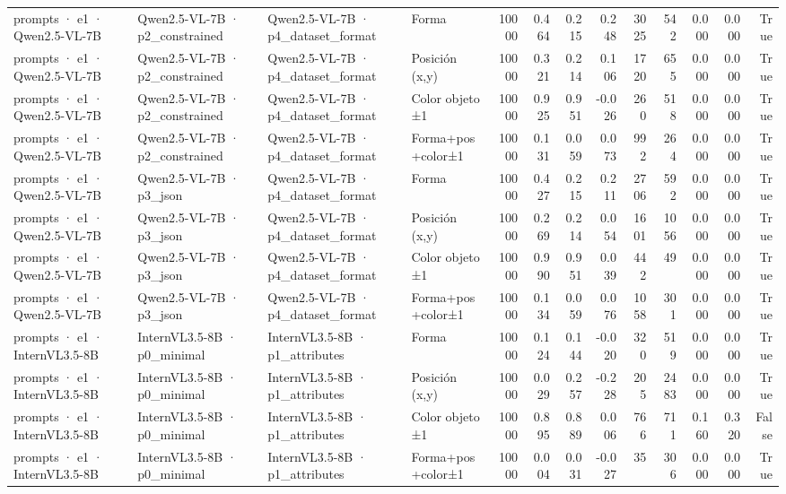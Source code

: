 \begin{tabular}{llllrrrrrrrrr}
prompts · e1 · Qwen2.5-VL-7B & Qwen2.5-VL-7B · p2\_constrained & Qwen2.5-VL-7B · p4\_dataset\_format & Forma & 10000 & 0.464 & 0.215 & 0.248 & 3025 & 542 & 0.000 & 0.000 & True \\
prompts · e1 · Qwen2.5-VL-7B & Qwen2.5-VL-7B · p2\_constrained & Qwen2.5-VL-7B · p4\_dataset\_format & Posición (x,y) & 10000 & 0.321 & 0.214 & 0.106 & 1720 & 655 & 0.000 & 0.000 & True \\
prompts · e1 · Qwen2.5-VL-7B & Qwen2.5-VL-7B · p2\_constrained & Qwen2.5-VL-7B · p4\_dataset\_format & Color objeto ±1 & 10000 & 0.925 & 0.951 & -0.026 & 260 & 518 & 0.000 & 0.000 & True \\
prompts · e1 · Qwen2.5-VL-7B & Qwen2.5-VL-7B · p2\_constrained & Qwen2.5-VL-7B · p4\_dataset\_format & Forma+pos+color±1 & 10000 & 0.131 & 0.059 & 0.073 & 992 & 264 & 0.000 & 0.000 & True \\
prompts · e1 · Qwen2.5-VL-7B & Qwen2.5-VL-7B · p3\_json & Qwen2.5-VL-7B · p4\_dataset\_format & Forma & 10000 & 0.427 & 0.215 & 0.211 & 2706 & 592 & 0.000 & 0.000 & True \\
prompts · e1 · Qwen2.5-VL-7B & Qwen2.5-VL-7B · p3\_json & Qwen2.5-VL-7B · p4\_dataset\_format & Posición (x,y) & 10000 & 0.269 & 0.214 & 0.054 & 1601 & 1056 & 0.000 & 0.000 & True \\
prompts · e1 · Qwen2.5-VL-7B & Qwen2.5-VL-7B · p3\_json & Qwen2.5-VL-7B · p4\_dataset\_format & Color objeto ±1 & 10000 & 0.990 & 0.951 & 0.039 & 442 & 49 & 0.000 & 0.000 & True \\
prompts · e1 · Qwen2.5-VL-7B & Qwen2.5-VL-7B · p3\_json & Qwen2.5-VL-7B · p4\_dataset\_format & Forma+pos+color±1 & 10000 & 0.134 & 0.059 & 0.076 & 1058 & 301 & 0.000 & 0.000 & True \\
prompts · e1 · InternVL3.5-8B & InternVL3.5-8B · p0\_minimal & InternVL3.5-8B · p1\_attributes & Forma & 10000 & 0.124 & 0.144 & -0.020 & 320 & 519 & 0.000 & 0.000 & True \\
prompts · e1 · InternVL3.5-8B & InternVL3.5-8B · p0\_minimal & InternVL3.5-8B · p1\_attributes & Posición (x,y) & 10000 & 0.029 & 0.257 & -0.228 & 205 & 2483 & 0.000 & 0.000 & True \\
prompts · e1 · InternVL3.5-8B & InternVL3.5-8B · p0\_minimal & InternVL3.5-8B · p1\_attributes & Color objeto ±1 & 10000 & 0.895 & 0.889 & 0.006 & 766 & 711 & 0.160 & 0.320 & False \\
prompts · e1 · InternVL3.5-8B & InternVL3.5-8B · p0\_minimal & InternVL3.5-8B · p1\_attributes & Forma+pos+color±1 & 10000 & 0.004 & 0.031 & -0.027 & 35 & 306 & 0.000 & 0.000 & True \\

\end{tabular}
